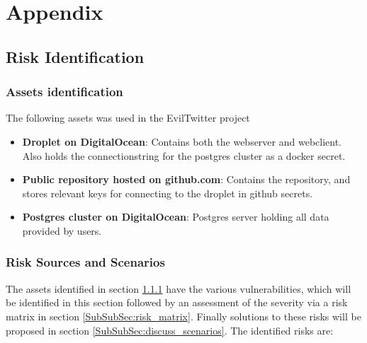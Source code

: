 \documentclass[report/main.tex]{subfiles}
\begin{document}
    \section{Appendix}
    
     \subsection{Risk Identification}
            \subsubsection{Assets identification}
            \label{SubSubSec:assets_identification}
                The following assets was used in the EvilTwitter project
            
                \begin{itemize}
                    \item \textbf{Droplet on DigitalOcean}: Contains both the webserver and webclient. Also holds the connectionstring for the postgres cluster as a docker secret.
                    \item \textbf{Public repository hosted on github.com}: Contains the repository, and stores relevant keys for connecting to the droplet in github secrets. 
                    \item \textbf{Postgres cluster on DigitalOcean}: Postgres server holding all data provided by users. 
                \end{itemize}
        
            \subsubsection{Risk Sources and Scenarios}
            \label{SubSubSec:risk_sources_and_scenarios}
                The assets identified in section \ref{SubSubSec:assets_identification} have the various vulnerabilities, which will be identified in this section followed by an assessment of the severity via a risk matrix in section \ref{SubSubSec:risk_matrix}. Finally solutions to these risks will be proposed in section \ref{SubSubSec:discuss_scenarios}. The identified risks are:
            
\end{document}

